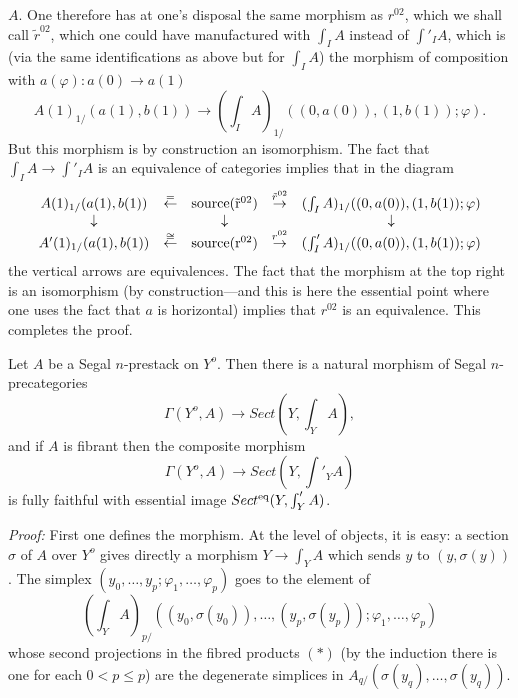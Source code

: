 $A$. One therefore has at one's disposal the same morphism as $r^{02}$, which
we shall call
$\tilde{r}^{02}$, which one could have manufactured with $\int _IA$ instead of $\int
'_IA$, which is (via the same identifications as above but for
$\int _IA$) the morphism of composition with $a(\varphi ):a(0)\rightarrow a(1)$
$$
A(1)_{1/}(a(1), b(1))\rightarrow
(\int _IA)_{1/}((0,a(0)), (1,b(1)); \varphi ).
$$
But this morphism is by construction an isomorphism. The fact that
$\int _IA\rightarrow \int '_IA$ is an equivalence of categories
implies that in the diagram
$$
\begin{array}{ccccc}
A(1)_{1/}(a(1), b(1))&\stackrel{=}{\leftarrow} &
{\rm source(\tilde{r}^{02})} &\stackrel{\tilde{r}^{02}}{\rightarrow}&
(\int _IA)_{1/}((0,a(0)), (1,b(1)); \varphi )\\
\downarrow && \downarrow && \downarrow \\
A'(1)_{1/}(a(1), b(1)) &
\stackrel{\cong}{\leftarrow} &
{\rm source(r^{02})} &\stackrel{r^{02}}{\rightarrow}&
(\int '_IA)_{1/}((0,a(0)), (1,b(1)); \varphi )
\end{array}
$$
the vertical arrows are equivalences. The fact that the morphism at the
top right is an isomorphism (by construction---and this is here
the essential point where one uses the fact that $a$ is horizontal) implies
that $r^{02}$ is an equivalence. This completes the proof.
\eop




\begin{proposition}
\label{gammasect}
Let $A$ be a Segal $n$-prestack on $Y^o$. Then there is a natural morphism of
Segal $n$-precategories
$$
\Gamma (Y^o,A)\rightarrow Sect (Y,\int _YA),
$$
and if $A$ is fibrant then the composite morphism
$$
\Gamma (Y^o,A)\rightarrow Sect (Y,\int '_YA)
$$
is fully faithful with essential image
$Sect^{\rm eq} (Y,\int '_YA)$.
\end{proposition}
{\em Proof:}
First one defines the morphism. At the level of objects, it is easy: a
section $\sigma$ of
$A$ over $Y^o$ gives directly a morphism
$Y\rightarrow \int _YA$ which sends $y$ to $(y,\sigma (y))$.
The simplex
$(y_0,\ldots , y_p; \varphi _1,\ldots , \varphi _p)$ goes to the element of
$$
(\int _YA)_{p/}((y_0,\sigma (y_0)),\ldots , (y_p, \sigma (y_p));
\varphi _1,\ldots , \varphi _p)
$$
whose second projections in the fibred products $(\ast )$
(by the induction there is one for each $0<p\leq p$) are the
degenerate simplices in $A_{q/}(\sigma (y_q), \ldots , \sigma (y_q))$.

